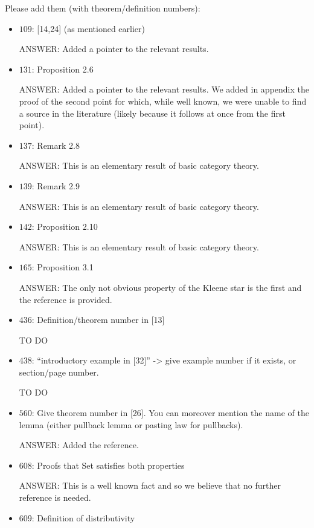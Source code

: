 \documentclass[english,11pt,a4paper]{article}
\begin{document}
Please add them (with theorem/definition numbers):
\begin{itemize}
	\item $109$: [14,24] (as mentioned earlier)
	
	ANSWER: Added a pointer to the relevant results.
	
	\item $131$: Proposition 2.6

	ANSWER: Added a pointer to the relevant results. We added in appendix the proof of the second point for which, while well known, we were unable to find a source in the literature (likely because it follows at once from the first point).

\item $137$: Remark 2.8

ANSWER: This is an elementary result of basic category theory.

\item $139$: Remark 2.9


ANSWER: This is an elementary result of basic category theory.

\item $142$: Proposition 2.10

ANSWER: This is an elementary result of basic category theory.

\item $165$: Proposition 3.1

ANSWER: The only not obvious property of the Kleene star is the first and the reference is provided.
	
	\item $436$: Definition/theorem number in [13]
	
TO DO	
	
	\item  $438$: ``introductory example in [32]'' -> give example number if it exists, or section/page number.
	
TO DO	

	\item $560$: Give theorem number in [26]. You can moreover mention the name of the lemma (either pullback lemma or pasting law for pullbacks).
	
ANSWER: Added the reference. 
	
	\item $608$: Proofs that Set satisfies both properties
	
	ANSWER: This is a well known fact and so we believe that no further reference is needed.
	
	\item $609$: Definition of distributivity
	

\end{itemize}
\end{document}
